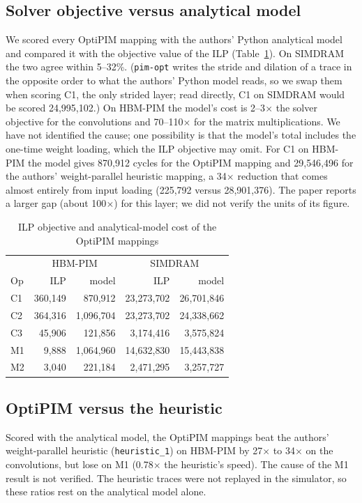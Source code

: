 \subsection{Solver objective versus analytical model}
\label{sec:objcheck}
We scored every OptiPIM mapping with the authors' Python analytical model and
compared it with the objective value of the ILP (Table~\ref{tab:obj}). On
SIMDRAM the two agree within 5--32\%. (\texttt{pim-opt} writes the stride and dilation of a trace in the opposite order to what the authors' Python model reads, so we swap them when scoring C1, the only strided layer; read directly, C1 on SIMDRAM would be scored 24{,}995{,}102.) On HBM-PIM the model's cost is 2--3$\times$
the solver objective for the convolutions and 70--110$\times$ for the matrix
multiplications. We have not identified the cause; one possibility is that
the model's total includes the one-time weight loading, which the ILP
objective may omit. For C1 on HBM-PIM the model gives 870{,}912 cycles for the
OptiPIM mapping and 29{,}546{,}496 for the authors' weight-parallel heuristic
mapping, a 34$\times$ reduction that comes almost entirely from input
loading (225{,}792 versus 28{,}901{,}376). The paper reports a larger gap
(about 100$\times$) for this layer; we did not verify the units of its figure.

\begin{table}[t]
\centering
\footnotesize
\caption{ILP objective and analytical-model cost of the OptiPIM mappings}
\label{tab:obj}
\begin{tabular}{lrrrr}
\hline
 & \multicolumn{2}{c}{HBM-PIM} & \multicolumn{2}{c}{SIMDRAM} \\
Op & ILP & model & ILP & model \\
\hline
C1 & 360{,}149 & 870{,}912 & 23{,}273{,}702 & 26{,}701{,}846 \\
C2 & 364{,}316 & 1{,}096{,}704 & 23{,}273{,}702 & 24{,}338{,}662 \\
C3 & 45{,}906 & 121{,}856 & 3{,}174{,}416 & 3{,}575{,}824 \\
M1 & 9{,}888 & 1{,}064{,}960 & 14{,}632{,}830 & 15{,}443{,}838 \\
M2 & 3{,}040 & 221{,}184 & 2{,}471{,}295 & 3{,}257{,}727 \\
\hline
\end{tabular}
\end{table}

\subsection{OptiPIM versus the heuristic}
Scored with the analytical model, the OptiPIM mappings beat the authors'
weight-parallel heuristic (\texttt{heuristic\_1}) on HBM-PIM by 27$\times$ to
34$\times$ on the convolutions, but lose on M1 (0.78$\times$ the heuristic's speed).
The cause of the M1 result is not verified. The heuristic traces were not
replayed in the simulator, so these ratios rest on the analytical model alone.

